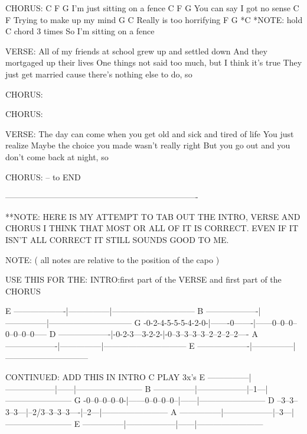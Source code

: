 CHORUS:
      C          F             G
       I'm just sitting on a fence
      C         F             G
       You can say I got no sense
        C             F
       Trying to make up my mind
        G             C
       Really is too horrifying
      F        G            *C    *NOTE: hold C chord 3 times 
       So I'm sitting on a fence



VERSE:
       All of my friends at school grew up and settled down
       And they mortgaged up their lives
       One things not said too much, but I think it's true
       They just get married cause there's nothing else to do, so



CHORUS:

CHORUS:


VERSE:
       The day can come when you get old and sick and tired of life
       You just realize
       Maybe the choice you made wasn't really right
       But you go out and you don't come back at night, so


CHORUS: -- to END
  
----------------------------------------------------------------------

**NOTE: HERE IS MY ATTEMPT TO TAB OUT THE INTRO, VERSE AND CHORUS
        I THINK THAT MOST OR ALL OF IT IS CORRECT. EVEN IF IT 
        ISN'T ALL CORRECT IT STILL SOUNDS GOOD TO ME.
  
NOTE: ( all notes are relative to the position of the capo )


USE THIS FOR THE:
INTRO:first part of the VERSE and first part of the CHORUS


E -------------------|---------------|------------------------------
B -------------------|---------------|------------------------------
G -0-2-4-5-5-5-4-2-0-|-------0-------|------0--0--0--0--0--0--0-----
D -------------------|-0-2-3---3-2-2-|-0--3--3--3--3--2--2--2--2----
A -------------------|---------------|------------------------------
E -------------------|---------------|------------------------------

CONTINUED:        ADD THIS IN INTRO    C
                      PLAY 3x's
E ---------------|------------------|------|------------------------
B ---------------|------------------|--1---|------------------------
G -0--0--0--0--0-|------0--0--0--0--|------|------------------------
D --3--3--3--3---|--2/3--3--3--3----|--2---|------------------------
A ---------------|------------------|--3---|------------------------
E ---------------|------------------|------|------------------------


